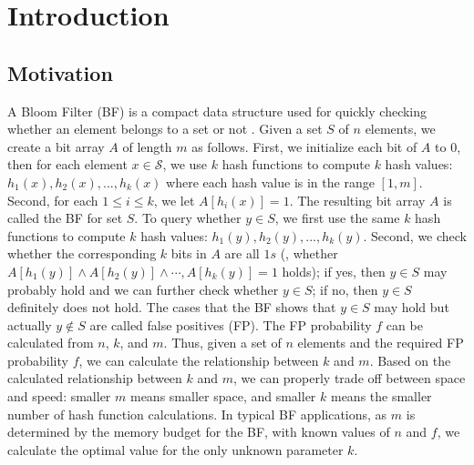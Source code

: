 \vspace{0.08in}
\presec \section{Introduction} \postsec
\vspace{0.06in}
\subsection{Motivation} \postsub
\vspace{0.06in}
%
A Bloom Filter (BF) is a compact data structure used for quickly checking whether an element belongs to a set or not \cite{BF1970}.
%
Given a set $S$ of $n$ elements, we create a bit array $A$ of length $m$ as follows.
%
First, we initialize each bit of $A$ to 0, then for each element $x \in \mathcal{S}$, we use $k$ hash functions to compute $k$ hash values: $h_1(x), h_2(x),..., h_{k}(x)$ where each hash value is in the range $[1, m]$.
%
Second, for each $1 \leqslant i \leqslant k$, we let $A[h_i(x)]=1$.
%
The resulting bit array $A$ is called the BF for set $S$.
%
To query whether $y \in S$, we first use the same $k$ hash functions to compute $k$ hash values: $h_1(y), h_2(y),..., h_{k}(y)$.
%
Second, we check whether the corresponding $k$ bits in $A$ are all $1s$ (\ie, whether $A[h_1(y)] \wedge A[h_2(y)] \wedge \cdots, A[h_{k}(y)]=1$ holds); if yes, then $y \in S$ may probably hold and we can further check whether $y \in S$; if no, then $y \in S$ definitely does not hold.
%
The cases that the BF shows that $y \in S$ may hold but actually $y \notin S$ are called false positives (FP).
%
The FP probability $f$ can be calculated from $n$, $k$, and $m$.
%
Thus, given a set of $n$ elements and the required FP probability $f$, we can calculate the relationship between $k$ and $m$.
%
Based on the calculated relationship between $k$ and $m$, we can properly trade off between space and speed: smaller $m$ means smaller space, and smaller $k$ means the smaller number of hash function calculations.
%
In typical BF applications, as $m$ is determined by the memory budget for the BF, with known values of $n$ and $f$, we calculate the optimal value for the only unknown parameter $k$.

